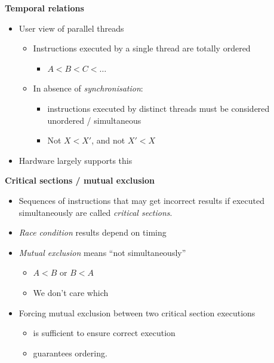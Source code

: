 \documentclass[11pt,a4paper]{article}
\begin{document}
\textbf{Temporal relations}
\begin{itemize}
    \item User view of parallel threads
        \begin{itemize}
            \item Instructions executed by a single thread are totally ordered
                \begin{itemize}
                    \item $A < B < C < \dots$
                \end{itemize}
            \item In absence of \emph{synchronisation}:
                \begin{itemize}
                    \item instructions executed by distinct threads must be considered
                        unordered / simultaneous
                    \item Not $X < X'$, and not $X' < X$
                \end{itemize}
        \end{itemize}
    \item Hardware largely supports this
\end{itemize}

\textbf{Critical sections / mutual exclusion}
\begin{itemize}
    \item Sequences of instructions that may get incorrect results if executed simultaneously
        are called \emph{critical sections}.
    \item \emph{Race condition} results depend on timing
    \item \emph{Mutual exclusion} means ``not simultaneously''
        \begin{itemize}
            \item $A < B$ or $B < A$
            \item We don't care which
        \end{itemize}
    \item Forcing mutual exclusion between two critical section executions
        \begin{itemize}
            \item is sufficient to ensure correct execution
            \item guarantees ordering.
        \end{itemize}
\end{itemize}
\end{document}
